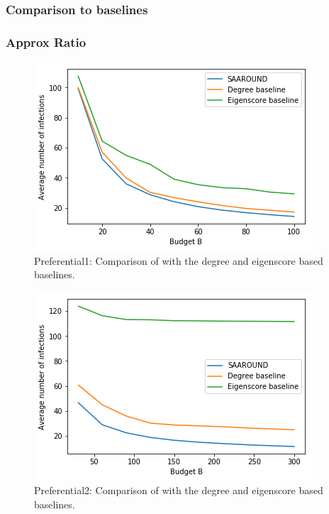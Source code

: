 \subsubsection{Comparison to baselines}
\subsubsection{Approx Ratio}
\begin{figure}[!h]
    \centering
    \includegraphics[scale = 0.55]{Figuresnew/pa1_obj.png}
    \caption{Preferential1: Comparison of \algo{} with the degree and eigenscore based baselines.}
    \label{fig:pa1approx}
\end{figure}

\begin{figure}[!h]
    \centering
    \includegraphics[scale = 0.55]{Figuresnew/pa2_obj.png}
    \caption{Preferential2: Comparison of \algo{} with the degree and eigenscore based baselines.}
    \label{fig:pa1approx}
\end{figure}

